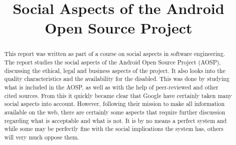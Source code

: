 \documentclass[conference]{IEEEtran}
\begin{document}
\title{Social Aspects of the Android Open Source Project}

\author{
{}
}


\maketitle


\begin{abstract}

This report was written as part of a course on social aspects in software engineering. The report studies the social aspects of the Android Open Source Project (AOSP), discussing the ethical, legal and business aspects of the project. It also looks into the quality characteristics and the availability for the disabled. This was done by studying what is included in the AOSP, as well as with the help of peer-reviewed and other cited sources.  From this it quickly became clear that Google have certainly taken many social aspects into account. However, following their mission to make all information available on the web, there are certainly some aspects that require further discussion regarding what is acceptable and what is not. It is by no means a perfect system and while some may be perfectly fine with the social implications the system has, others will very much oppose them. 


\end{abstract}
\end{document}

